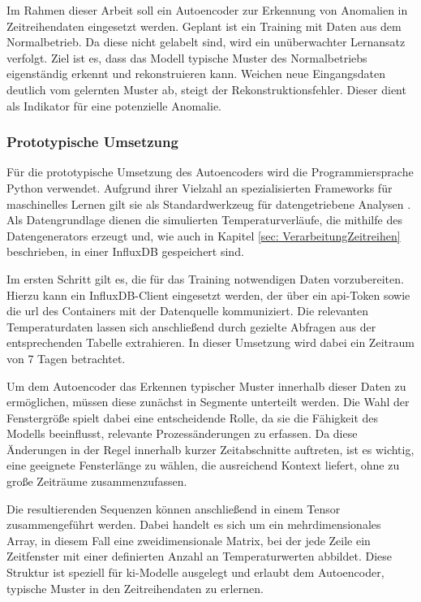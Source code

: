 Im Rahmen dieser Arbeit soll ein Autoencoder zur Erkennung von Anomalien in Zeitreihendaten eingesetzt werden. 
Geplant ist ein Training mit Daten aus dem Normalbetrieb. 
Da diese nicht gelabelt sind, wird ein unüberwachter Lernansatz verfolgt. 
Ziel ist es, dass das Modell typische Muster des Normalbetriebs eigenständig erkennt und rekonstruieren kann. 
Weichen neue Eingangsdaten deutlich vom gelernten Muster ab, steigt der Rekonstruktionsfehler.
Dieser dient als Indikator für eine potenzielle Anomalie.

\subsubsection{Prototypische Umsetzung}
Für die prototypische Umsetzung des Autoencoders wird die Programmiersprache Python verwendet. 
Aufgrund ihrer Vielzahl an spezialisierten Frameworks für maschinelles Lernen gilt sie als Standardwerkzeug für datengetriebene Analysen \cite{Python}.
Als Datengrundlage dienen die simulierten Temperaturverläufe, die mithilfe des Datengenerators erzeugt und, wie auch in Kapitel \ref{sec: VerarbeitungZeitreihen} beschrieben, in einer InfluxDB gespeichert sind.

Im ersten Schritt gilt es, die für das Training notwendigen Daten vorzubereiten. 
Hierzu kann ein InfluxDB-Client eingesetzt werden, der über ein \acs{api}-Token sowie die \acs{url} des Containers mit der Datenquelle kommuniziert.
Die relevanten Temperaturdaten lassen sich anschließend durch gezielte Abfragen aus der entsprechenden Tabelle extrahieren.
In dieser Umsetzung wird dabei ein Zeitraum von 7 Tagen betrachtet.

Um dem Autoencoder das Erkennen typischer Muster innerhalb dieser Daten zu ermöglichen, müssen diese zunächst in Segmente unterteilt werden.
Die Wahl der Fenstergröße spielt dabei eine entscheidende Rolle, da sie die Fähigkeit des Modells beeinflusst, relevante Prozessänderungen zu erfassen.
Da diese Änderungen in der Regel innerhalb kurzer Zeitabschnitte auftreten, ist es wichtig, eine geeignete Fensterlänge zu wählen, die ausreichend Kontext liefert, ohne zu große Zeiträume zusammenzufassen.



Die resultierenden Sequenzen können anschließend in einem Tensor zusammengeführt werden. 
Dabei handelt es sich um ein mehrdimensionales Array, in diesem Fall eine zweidimensionale Matrix, bei der jede Zeile ein Zeitfenster mit einer definierten Anzahl an Temperaturwerten abbildet. 
Diese Struktur ist speziell für \acs{ki}-Modelle ausgelegt und erlaubt dem Autoencoder, typische Muster in den Zeitreihendaten zu erlernen.

